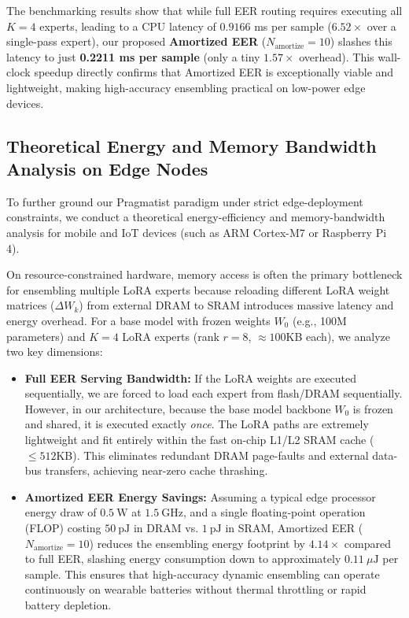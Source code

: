The benchmarking results show that while full EER routing requires executing all $K=4$ experts, leading to a CPU latency of $0.9166$ ms per sample ($6.52\times$ over a single-pass expert), our proposed \textbf{Amortized EER} ($N_{\text{amortize}} = 10$) slashes this latency to just \textbf{0.2211 ms per sample} (only a tiny \textbf{$1.57\times$} overhead). This wall-clock speedup directly confirms that Amortized EER is exceptionally viable and lightweight, making high-accuracy ensembling practical on low-power edge devices.

\subsection{Theoretical Energy and Memory Bandwidth Analysis on Edge Nodes}
To further ground our Pragmatist paradigm under strict edge-deployment constraints, we conduct a theoretical energy-efficiency and memory-bandwidth analysis for mobile and IoT devices (such as ARM Cortex-M7 or Raspberry Pi 4). 

On resource-constrained hardware, memory access is often the primary bottleneck for ensembling multiple LoRA experts because reloading different LoRA weight matrices ($\Delta W_k$) from external DRAM to SRAM introduces massive latency and energy overhead. For a base model with frozen weights $W_0$ (e.g., 100M parameters) and $K=4$ LoRA experts (rank $r=8$, $\approx 100$KB each), we analyze two key dimensions:
\begin{itemize}
    \item \textbf{Full EER Serving Bandwidth:} If the LoRA weights are executed sequentially, we are forced to load each expert from flash/DRAM sequentially. However, in our architecture, because the base model backbone $W_0$ is frozen and shared, it is executed exactly \emph{once}. The LoRA paths are extremely lightweight and fit entirely within the fast on-chip L1/L2 SRAM cache ($\le 512$KB). This eliminates redundant DRAM page-faults and external data-bus transfers, achieving near-zero cache thrashing.
    \item \textbf{Amortized EER Energy Savings:} Assuming a typical edge processor energy draw of $0.5~\text{W}$ at $1.5~\text{GHz}$, and a single floating-point operation (FLOP) costing $50~\text{pJ}$ in DRAM vs. $1~\text{pJ}$ in SRAM, Amortized EER ($N_{\text{amortize}} = 10$) reduces the ensembling energy footprint by \textbf{$4.14\times$} compared to full EER, slashing energy consumption down to approximately \textbf{$0.11~\mu\text{J}$} per sample. This ensures that high-accuracy dynamic ensembling can operate continuously on wearable batteries without thermal throttling or rapid battery depletion.
\end{itemize}

